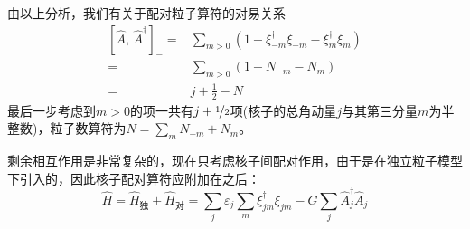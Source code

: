 由以上分析，我们有关于配对粒子算符的对易关系
\begin{equation}
    \begin{aligned}
        \left[\hat{A},\, \hat{A}^{\dagger}\right]_{-}
        =& \sum_{m > 0}(1 - \xi_{-m}^{\dagger}\xi_{-m} - \xi_{m}^{\dagger} \xi_{m}) \\
        =&  \sum_{m > 0}(1 - N_{-m} - N_{m}) \\
        =& j + \frac{1}{2} - N
    \end{aligned}
\end{equation}
最后一步考虑到$m>0$的项一共有$j + \nicefrac{1}{2}$项(核子的总角动量$j$与其第三分量$m$为半整数)，粒子数算符为$N = \sum_{m} N_{-m} + N_{m}$。

剩余相互作用是非常复杂的，现在只考虑核子间配对作用，由于是在独立粒子模型下引入的，因此核子配对算符应附加在之后：
\begin{equation}
    \hat{H} = \hat{H}_{\text{独}} + \hat{H}_{\text{对}}
    = \sum_{j} \varepsilon_j \sum_{m} \xi_{jm}^{\dagger} \xi_{jm} - G\sum_{j}\hat{A}_{j}^{\dagger}\hat{A}_{j}
\end{equation}
